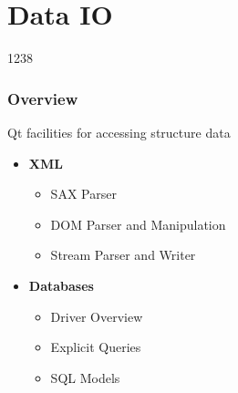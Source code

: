 %
%
%
%

\section{Data IO}

\begin{slide}{1238}\label{xml-processing}
\frametitle{Overview}

Qt facilities for accessing structure data

\begin{itemize}
\item \textbf{XML}
  \begin{itemize}
  \item SAX Parser
  \item DOM Parser and Manipulation
  \item Stream Parser and Writer
  \end{itemize}
\item \textbf{Databases}
  \begin{itemize}
  \item Driver Overview
  \item Explicit Queries
  \item SQL Models
  \end{itemize}
\end{itemize}
\end{slide}






